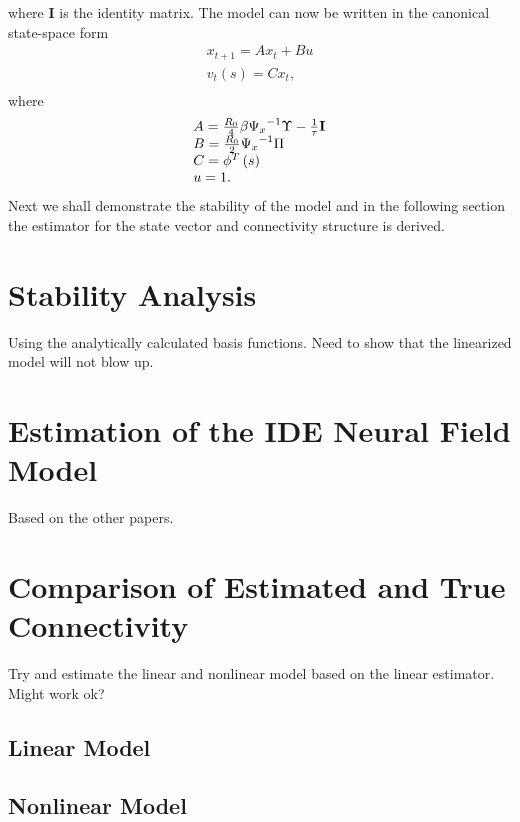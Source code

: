 \documentclass[onecolumn,draftcls]{IEEEtran}
\begin{document}
where \textbf{I} is the identity matrix. The model can now be written in the canonical state-space form
\begin{equation}\label{27}
\begin{array}{c}
 {x_{t + 1}} = A{x_t} + Bu \\
 {v_t}\left( s \right) = C{x_t}, \\
 \end{array}
\end{equation}
where
\begin{equation}\label{28}
\begin{array}{l}
 A = \frac{{{R_0}}}{4}\beta {\Psi _x}^{ - 1}\Upsilon  - \frac{1}{\tau }{\bf{I}} \\
 B = \frac{{{R_0}}}{2}{\Psi _x}^{ - 1}\Pi  \\
 C = {\phi ^T}\left( s \right) \\
 u = 1. \\
 \end{array}
\end{equation}
Next we shall demonstrate the stability of the model and in the following section the estimator for the state vector and connectivity structure is derived.

\section{Stability Analysis}
Using the analytically calculated basis functions. Need to show that the linearized model will not blow up.

\section{Estimation of the IDE Neural Field Model}
Based on the other papers.

\section{Comparison of Estimated and True Connectivity}
Try and estimate the linear and nonlinear model based on the linear estimator. Might work ok?

\subsection{Linear Model}

\subsection{Nonlinear Model}
\end{document}
